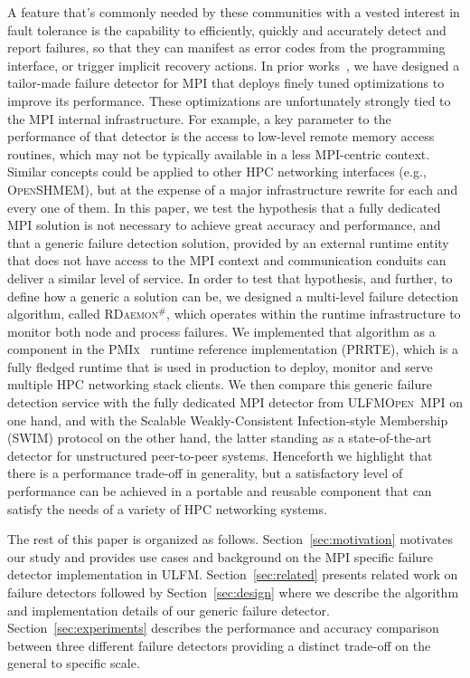 \documentclass[sigconf]{acmart}
\newcommand{\prrte}[0]{\textsc{PRRTE}\xspace}
\newcommand{\pmix}[0]{\textsc{PMIx}\xspace}
\newcommand{\ompi}[0]{\textsc{Open~MPI}\xspace}
\newcommand{\ulfm}[0]{\textsc{ULFM}\xspace}
\newcommand{\mpi}[0]{\textsc{MPI}\xspace}
\newcommand{\oshmem}[0]{\textsc{OpenSHMEM}\xspace}
\newcommand{\ourwork}[0]{\textsc{RDaemon}\ensuremath{^\#}\xspace}
\begin{document}
A feature that's commonly needed by these communities with a vested
interest in fault tolerance is the capability to efficiently, quickly and
accurately detect and report failures, so that they can manifest as
error codes from the programming interface, or trigger implicit recovery
actions. In prior works~\cite{George16}, we have designed a tailor-made
failure detector for \mpi that deploys finely tuned optimizations to
improve its performance. These optimizations are unfortunately strongly
tied to the \mpi internal infrastructure. For example, a key parameter to
the performance of that detector is the
access to low-level remote memory access routines, which may not be typically
available in a less \mpi-centric context. Similar concepts could be
applied to other HPC networking interfaces (e.g., \oshmem), but at
the expense of a major infrastructure rewrite for each and every one of
them. In this paper, we test the hypothesis that a fully dedicated \mpi
solution is not necessary to achieve great accuracy and performance, and
that a generic failure detection solution, provided by an external runtime
entity that does not have access to the \mpi context and communication conduits
can deliver a similar level of service. In order to test that hypothesis,
and further, to define how a generic a solution can be, we designed
a multi-level failure detection algorithm, called \ourwork, which operates
within the runtime infrastructure to monitor both node and process
failures. We implemented that algorithm as a component in the \pmix~\cite{CASTAIN18} runtime reference implementation (\prrte), which is a fully fledged runtime that is
used in production to deploy, monitor and
serve multiple HPC networking stack clients.
We then compare this generic
failure detection service with the fully dedicated \mpi detector from
\ulfm \ompi on one hand, and with the Scalable Weakly-Consistent Infection-style Membership (SWIM) protocol on the other hand, the latter standing
as a state-of-the-art detector for unstructured peer-to-peer systems. Henceforth
we highlight that there is a performance trade-off in generality, but a
satisfactory level of performance can be achieved in a portable and reusable
component that can satisfy the needs of a variety of HPC networking systems.

The rest of this paper is organized as follows. Section~\ref{sec:motivation}
motivates our study and provides use cases and background on the \mpi specific
failure detector implementation in \ulfm. Section~\ref{sec:related} presents
related work on failure detectors followed by Section~\ref{sec:design} where we
describe the algorithm and implementation details of our generic failure
detector. Section~\ref{sec:experiments} describes the performance and accuracy
comparison between three different failure detectors providing a distinct
trade-off on the general to specific scale.
\end{document}
